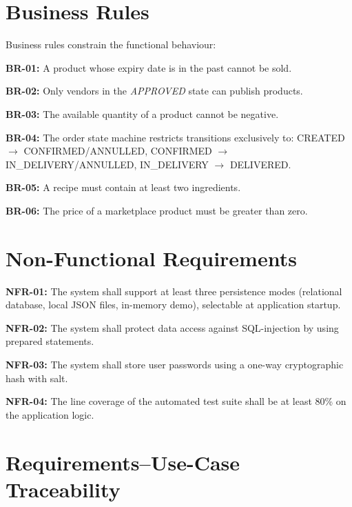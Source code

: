 \section{Business Rules}

Business rules constrain the functional behaviour:

\begin{reqs}
    \item \textbf{BR-01:} A product whose expiry date is in the past cannot be
    sold.
    \item \textbf{BR-02:} Only vendors in the \emph{APPROVED} state can
    publish products.
    \item \textbf{BR-03:} The available quantity of a product cannot be
    negative.
    \item \textbf{BR-04:} The order state machine restricts transitions
    exclusively to: CREATED $\rightarrow$ CONFIRMED/ANNULLED, CONFIRMED $
    \rightarrow$ IN\_DELIVERY/ANNULLED, IN\_DELIVERY $\rightarrow$ DELIVERED.
    \item \textbf{BR-05:} A recipe must contain at least two ingredients.
    \item \textbf{BR-06:} The price of a marketplace product must be greater
    than zero.
\end{reqs}

\section{Non-Functional Requirements}

\begin{reqs}
    \item \textbf{NFR-01:} The system shall support at least three persistence
    modes (relational database, local JSON files, in-memory demo), selectable
    at application startup.
    \item \textbf{NFR-02:} The system shall protect data access against
    SQL-injection by using prepared statements.
    \item \textbf{NFR-03:} The system shall store user passwords using a
    one-way cryptographic hash with salt.
    \item \textbf{NFR-04:} The line coverage of the automated test suite shall
    be at least 80\% on the application logic.
\end{reqs}

\section{Requirements--Use-Case Traceability}

